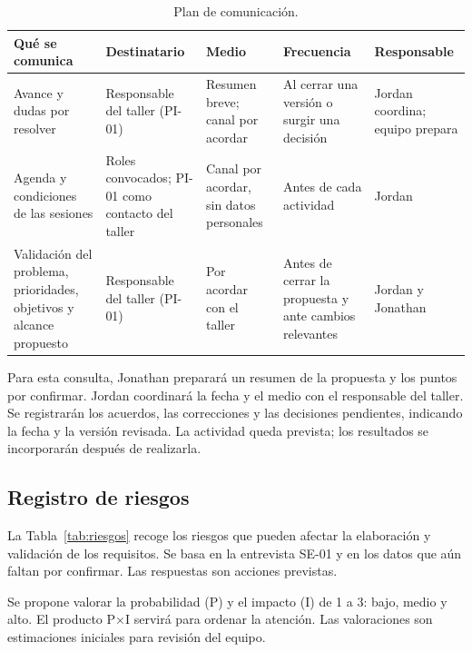 \begin{table}[H]
  \centering
  \caption{Plan de comunicaci\'on.}
  \label{tab:comunicacion}
  \noindent\begin{tabularx}{\linewidth}{@{}YL{2.4cm}L{2.4cm}L{2.2cm}L{2.4cm}@{}}
    \toprule
    \textbf{Qu\'e se comunica} & \textbf{Destinatario} & \textbf{Medio} & \textbf{Frecuencia} & \textbf{Responsable} \\
    \midrule
    Avance y dudas por resolver & Responsable del taller (PI-01) & Resumen breve; canal por acordar & Al cerrar una versión o surgir una decisión & Jordan coordina; equipo prepara \\
    Agenda y condiciones de las sesiones & Roles convocados; PI-01 como contacto del taller & Canal por acordar, sin datos personales & Antes de cada actividad & Jordan \\
    Validación del problema, prioridades, objetivos y alcance propuesto & Responsable del taller (PI-01) & Por acordar con el taller & Antes de cerrar la propuesta y ante cambios relevantes & Jordan y Jonathan \\
    \bottomrule
  \end{tabularx}
\end{table}

Para esta consulta, Jonathan preparará un resumen de la propuesta y los puntos por confirmar.
Jordan coordinará la fecha y el medio con el responsable del taller. Se registrarán los acuerdos,
las correcciones y las decisiones pendientes, indicando la fecha y la versión revisada. La
actividad queda prevista; los resultados se incorporarán después de realizarla.

\subsection{Registro de riesgos}\label{sec:registro-riesgos}

La Tabla~\ref{tab:riesgos} recoge los riesgos que pueden afectar la elaboración y validación de los requisitos. Se basa en la entrevista SE-01 y en los datos que aún faltan por confirmar. Las respuestas son acciones previstas.

Se propone valorar la probabilidad (P) y el impacto (I) de 1 a 3: bajo, medio y alto. El producto P$\times$I servirá para ordenar la atención. Las valoraciones son estimaciones iniciales para revisión del equipo.

